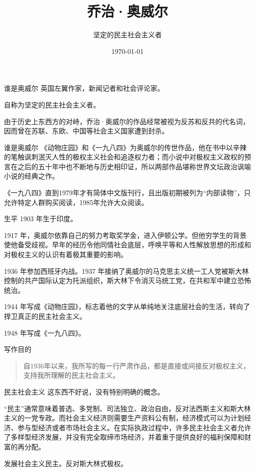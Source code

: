 \documentclass{beamer}
\title{乔治·奥威尔}
\subtitle{坚定的民主社会主义者}
\date{\today}
\begin{document}
  \maketitle
  \begin{frame}{谁是奥威尔}
    英国左翼作家，新闻记者和社会评论家。

    自称为坚定的民主社会主义者。

    由于历史上东西方的对峙，乔治·奥威尔的作品经常被视为反苏和反共的代名词，因而曾在苏联、东欧、中国等社会主义国家遭到封杀。
  \end{frame}
  \begin{frame}{谁是奥威尔}
    《动物庄园》和《一九八四》为奥威尔的传世作品，他在书中以辛辣的笔触讽刺泯灭人性的极权主义社会和追逐权力者；而小说中对极权主义政权的预言在之后的五十年中也不断地与历史相印证，所以两部作品堪称世界文坛政治讽喻小说的经典之作。

    《一九八四》直到1979年才有简体中文版刊行，且出版初期被列为“内部读物”，只允许特定人群购买阅读，1985年允许大众阅读。
  \end{frame}
  \begin{frame}{生平}
    1903 年生于印度。
    \pause

    1917 年，奥威尔依靠自己的努力考取奖学金，进入伊顿公学。但他穷学生的背景使他备受歧视。早年的经历令他同情社会底层，呼唤平等和人性解放思想的形成和对极权主义的认识有着极其重要的影响。
    \pause

    1936 年参加西班牙内战。1937 年接纳了奥威尔的马克思主义统一工人党被斯大林控制的共产国际认定为托派组织，斯大林下令消灭马统工党，在共和军中建立恐怖统治。
    \pause

    1944 年写成《动物庄园》，标志着他的文字从单纯地关注底层社会的生活，转向了捍卫真正的民主社会主义。
    \pause

    1948 年写成《一九八四》。
  \end{frame}
  \begin{frame}{写作目的}
    \begin{quote}
      \kaishu 自1936年以来，我所写的每一行严肃作品，都是直接或间接反对极权主义，支持我所理解的民主社会主义。
    \end{quote}
  \end{frame}
  \begin{frame}{民主社会主义}
    这东西不好说，没有特别明确的概念。
    \pause

    “民主”通常意味着普选、多党制、司法独立、政治自由，反对法西斯主义和斯大林主义的一党专政。而社会主义经济则需要生产资料公有制，经济模式可以为计划经济、参与型经济或者市场社会主义。在实际执政过程中，许多民主社会主义者允许了多样型经济发展，并没有完全取缔市场经济，并着重于提供良好的福利保障和财富的再分配。
    \pause

    发展社会主义民主。反对斯大林式极权。
  \end{frame}
\end{document}
